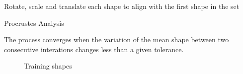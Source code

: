 \begin{algorithm}[ht]
Rotate, scale and translate each shape to align with the
first shape in the set\;
\caption{Procrustes Analysis}
\end{algorithm}
The process converges when the variation of the mean shape between two
consecutive interations changes less than a given tolerance.

\begin{figure}[!htb] \centering
  \begin{minipage}{0.49\textwidth}
  \caption{Training shapes}
\end{minipage}
\begin{minipage}{0.49\textwidth} \centering

\end{minipage}
\end{figure}

